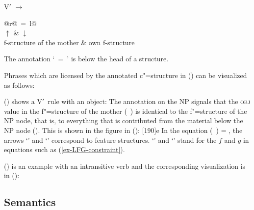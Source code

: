 \ea
V$'$ $\to$ \begin{tabular}[t]{@{}r@{~=~}l@{}}
           \\
           $\uparrow$ &  $\downarrow$\\ 
           f-structure of the mother & own f-structure\\
           \end{tabular}
\z
The annotation `\up~=~\down' is below the head of a structure.

Phrases which are licensed by the annotated c"=structure in () can be visualized as follows:
\ea
{}%
\hspace*{3em}%
\z

\noindent
() shows a V$'$~rule with an object:
\ea
{}
\z
%
The annotation on the NP signals that the \textsc{obj} value in the f"=structure of the mother
\mbox{(\up\ \obj)} is identical to the f"=structure of the NP node, that is, to everything that is
contributed from the material below the NP node (\down). 
This is shown in the figure in ():
\ea
{}%
\hspace*{3em}%
[190]{e}
\z
In the equation (\up\ \obj) = \down{},  the arrows `\up' and `\down' correspond to feature structures. `\up' and
`\down' stand for the $f$ and $g$ in equations such as (\ref{ex-LFG-constraint}).

() is an example with an intransitive verb
and the corresponding visualization is in ():

\ea
{}
\z

\ea
{}
\hspace*{4em}
\z
{}

\subsection{Semantics}
\label{lfg-semantics}
\label{glue-semantics}

